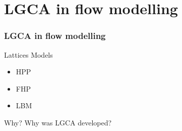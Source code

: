 \documentclass{beamer}
\begin{document}
	\section{LGCA in flow modelling}
	\begin{frame}
	\frametitle{LGCA in flow modelling}
	\centering
    \begin{block}{Lattices Models}
    \begin{itemize}
    \item HPP 
    \item FHP
    \item LBM
    \end{itemize}
    \end{block}
    \endminipage\hfill
	\centering
    \begin{block}{Why?}
    Why was LGCA developed?
    \end{block}
    \endminipage\hfill
	\end{frame}

\end{document}
